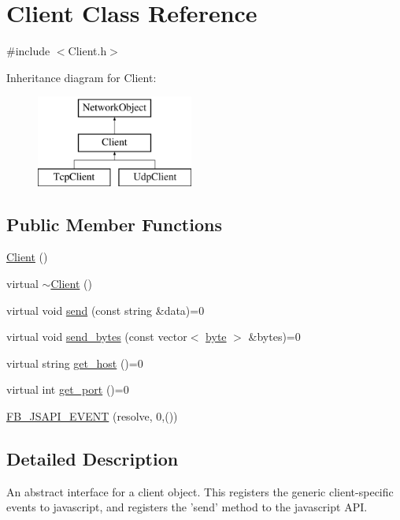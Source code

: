 \hypertarget{classClient}{
\section{Client Class Reference}
\label{classClient}
}


{\ttfamily \#include $<$Client.h$>$}

Inheritance diagram for Client:\begin{figure}[H]
\begin{center}
\leavevmode
\includegraphics[height=3.000000cm]{classClient}
\end{center}
\end{figure}
\subsection*{Public Member Functions}
\begin{DoxyCompactItemize}
\item 
\hyperlink{classClient_ae51af7aa6b8f591496a8f6a4a87a14bf}{Client} ()
\item 
virtual \hyperlink{classClient_a897ff0f31827f7be3c661623341605ed}{$\sim$Client} ()
\item 
virtual void \hyperlink{classClient_ae02f1c7ffac49b7543244da28fbb58aa}{send} (const string \&data)=0
\item 
virtual void \hyperlink{classClient_a6d77759bc7022e45a3e4326757bd6b8b}{send\_\-bytes} (const vector$<$ \hyperlink{Event_8h_ae0aa21f6bcb621fe36c2c962aa0452fe}{byte} $>$ \&bytes)=0
\item 
virtual string \hyperlink{classClient_a01e5ea1bae012b2a46e8abd6b0bab704}{get\_\-host} ()=0
\item 
virtual int \hyperlink{classClient_ac9e4f13eef6b9a776b2bb6cca9d4f78b}{get\_\-port} ()=0
\item 
\hyperlink{classClient_a382edd74d967440910a27735d6d83ad9}{FB\_\-JSAPI\_\-EVENT} (resolve, 0,())
\end{DoxyCompactItemize}


\subsection{Detailed Description}
An abstract interface for a client object. This registers the generic client-\/specific events to javascript, and registers the 'send' method to the javascript API. 

